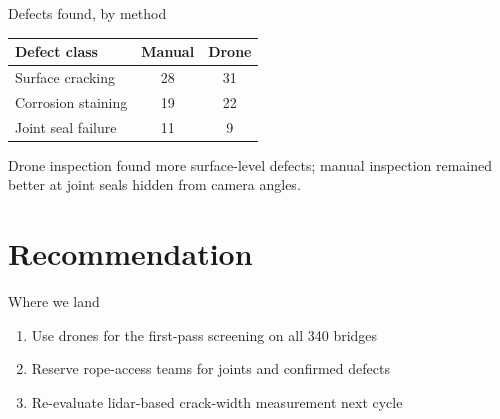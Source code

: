 \documentclass[xcolor={rgb}]{beamer}
\begin{document}
\begin{frame}{Defects found, by method}
  \begin{table}
    \centering
    \begin{tabular}{lcc}
      \toprule
      Defect class & Manual & Drone \\
      \midrule
      Surface cracking   & 28 & 31 \\
      Corrosion staining & 19 & 22 \\
      Joint seal failure & 11 & 9  \\
      \bottomrule
    \end{tabular}
  \end{table}
  Drone inspection found more surface-level defects; manual inspection remained better at joint seals hidden from camera angles.
\end{frame}

\section{Recommendation}

\begin{frame}{Where we land}
  \begin{enumerate}
    \item Use drones for the first-pass screening on all 340 bridges
    \item Reserve rope-access teams for joints and confirmed defects
    \item Re-evaluate lidar-based crack-width measurement next cycle
  \end{enumerate}
\end{frame}
\end{document}
